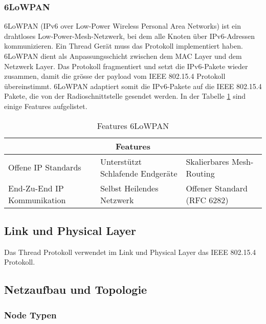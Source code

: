 \subsubsection{6LoWPAN}\label{subsubsec:6LoWPAN}
6LoWPAN (IPv6 over Low-Power Wireless Personal Area Networks) ist ein drahtloses Low-Power-Mesh-Netzwerk, bei dem alle Knoten über IPv6-Adressen kommunizieren. Ein Thread Gerät muss das Protokoll implementiert haben. 6LoWPAN dient als Anpassungsschicht zwischen dem MAC Layer und dem Netzwerk Layer. Das Protokoll fragmentiert und setzt die IPv6-Pakete wieder zusammen, damit die grösse der payload vom IEEE 802.15.4 Protokoll übereinstimmt. 6LoWPAN adaptiert somit die IPv6-Pakete auf die IEEE 802.15.4 Pakete, die von der Radioschnittstelle gesendet werden. \cite{thubert_compression_2011} In der Tabelle \ref{table:Features6LoWPAN} sind einige Features aufgelistet. \cite[Seite 3-10]{thread_group_inc_thread_2017}
\begin{table}[H]
	\centering
	\begin{adjustbox}{width=1\textwidth}
		\begin{tabular}{@{}|l|l|l|@{}}
			\toprule
			\multicolumn{3}{|c|}{\textbf{Features}}                                                      \\ \midrule
			Offene IP Standards         & Unterstützt Schlafende Endgeräte & Skalierbares Mesh-Routing   \\ \midrule
			End-Zu-End IP Kommunikation & Selbst Heilendes Netzwerk        & Offener Standard (RFC 6282) \\ \bottomrule
		\end{tabular}
	\end{adjustbox}
	\caption{Features 6LoWPAN}
	\label{table:Features6LoWPAN}
\end{table}

\subsection{Link und Physical Layer}\label{subsec:IEE802154}
Das Thread Protokoll verwendet im Link und Physical Layer das IEEE 802.15.4 Protokoll. \cite{ieee_computer_society_ieee_2020} \cite[Seite 3-2]{thread_group_inc_thread_2017}
\newpage

\subsection{Netzaufbau und Topologie}\label{subsec:NetzaufbauundTopologie}

\subsubsection{Node Typen}\label{subsubsec:NodeTypen}

